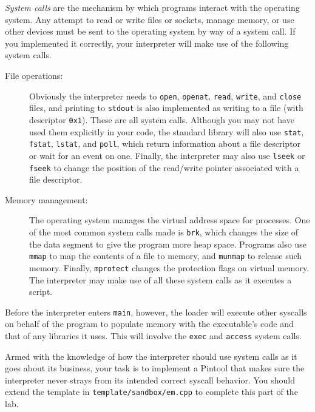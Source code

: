 \documentclass[11pt]{article}
\begin{document}
\emph{System calls} are the mechanism by which programs interact with the operating system. Any attempt to read or write files or sockets, manage memory, or use other devices must be sent to the operating system by way of a system call. If you implemented it correctly, your interpreter will make use of the following system calls.
\begin{description}
\item[File operations:] Obviously the interpreter needs to \verb'open', \verb'openat', \verb'read', \verb'write', and \verb'close' files, and printing to \verb'stdout' is also implemented as writing to a file (with descriptor \verb'0x1'). These are all system calls. Although you may not have used them explicitly in your code, the standard library will also use \verb'stat', \verb'fstat', \verb'lstat', and \verb'poll', which return information about a file descriptor or wait for an event on one. Finally, the interpreter may also use \verb'lseek' or \verb'fseek' to change the position of the read/write pointer associated with a file descriptor.

\item[Memory management:] The operating system manages the virtual address space for processes. One of the most common system calls made is \verb'brk', which changes the size of the data segment to give the program more heap space. Programs also use \verb'mmap' to map the contents of a file to memory, and \verb'munmap' to release such memory. Finally, \verb'mprotect' changes the protection flags on virtual memory. The interpreter may make use of all these system calls as it executes a script.
\end{description}
Before the interpreter enters \verb'main', however, the loader will execute other syscalls on behalf of the program to populate memory with the executable's code and that of any libraries it uses. This will involve the \verb'exec' and \verb'access' system calls.

Armed with the knowledge of how the interpreter should use system calls as it goes about its business, your task is to implement a Pintool that makes sure the interpreter never strays from its intended correct syscall behavior. You should extend the template in \verb'template/sandbox/em.cpp' to complete this part of the lab.
\end{document}
